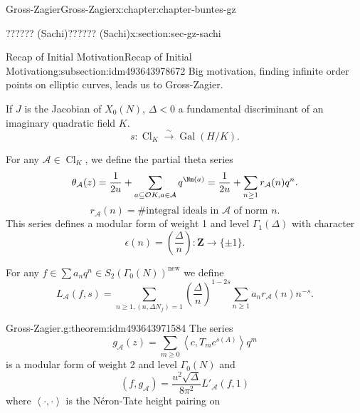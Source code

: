 \documentclass[oneside,10pt,]{book}
\numberwithin{equation}{section}
\newcommand{\legendre}[2]{\left(\frac{#1}{#2}\right)}
\newcommand{\pair}[2]{\left\langle #1, #2 \right\rangle}
\newcommand{\ZZ}{\mathbf{Z}}
\newcommand{\ints}{\mathcal{O}}
\DeclareMathOperator{\Cl}{Cl}
\newcommand{\Gal}[2]{\operatorname{Gal}(#1/#2)}
\newcommand{\lt}{<}
\begin{document}
\begin{chapterptx}{Gross-Zagier}{}{Gross-Zagier}{}{}{x:chapter:chapter-buntes-gz}
\begin{sectionptx}{?????? (Sachi)}{}{?????? (Sachi)}{}{}{x:section:sec-gz-sachi}
%
%
\typeout{************************************************}
\typeout{************************************************}
%
\begin{subsectionptx}{Recap of Initial Motivation}{}{Recap of Initial Motivation}{}{}{g:subsection:idm493643978672}
Big motivation, finding infinite order points on elliptic curves, leads us to Gross-Zagier.%
\par
If \(J\) is the Jacobian of \(X_0(N)\), \(\Delta \lt  0\) a fundamental discriminant of an imaginary quadratic field \(K\).%
\begin{equation*}
s \colon \Cl_K \xrightarrow\sim \Gal HK\text{.}
\end{equation*}
%
\par
For any \(\mathcal A \in \Cl_K\), we define the partial theta series%
\begin{equation*}
\theta _{\mathcal A} (z) = \frac{1}{2u} + \sum _{a \subseteq \ints K,a\in \mathcal A} q^{\Nm(a)} = \frac{1}{2u} + \sum_{n \ge 1} r_{\mathcal A}(n)q^n\text{.}
\end{equation*}
%
\begin{equation*}
r_{\mathcal A}(n) = \#\text{integral ideals in }\mathcal A\text{ of norm }n\text{.}
\end{equation*}
This series defines a modular form of weight 1 and level \(\Gamma _1(\Delta )\) with character%
\begin{equation*}
\epsilon (n) = \legendre{\Delta }{n} \colon  \ZZ \to \{\pm 1\}\text{.}
\end{equation*}
%
\par
For any \(f \in \sum a_n q^n \in S_2(\Gamma _0(N))^{\text{new}}\) we define%
\begin{equation*}
L_{\mathcal A} (f,s) = \sum_{n \ge 1, (n, \Delta  N_f) = 1} \legendre\Delta n^{1-2s} \sum_{n\ge 1}a_n r_{\mathcal A}(n)n^{-s}\text{.}
\end{equation*}
%
\begin{theorem}{Gross-Zagier.}{}{g:theorem:idm493643971584}%
The series%
\begin{equation*}
g_{\mathcal A} (z) = \sum_{m \ge 0} \pair c{T_m c^{s(A)}} q^m
\end{equation*}
is a modular form of weight 2 and level \(\Gamma _0(N)\) and%
\begin{equation*}
(f,g_{\mathcal A }) = \frac{u^2 \sqrt\Delta }{8\pi ^2} L'_{\mathcal A}(f,1)
\end{equation*}
where \(\pair \cdot \cdot \) is the Néron-Tate height pairing on%

\end{theorem}
\end{subsectionptx}
\end{sectionptx}
\end{chapterptx}
\end{document}
